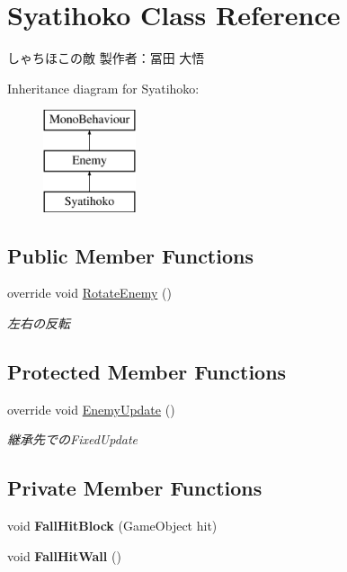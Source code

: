 \hypertarget{class_syatihoko}{}\section{Syatihoko Class Reference}
\label{class_syatihoko}


しゃちほこの敵 製作者：冨田 大悟  


Inheritance diagram for Syatihoko\+:\begin{figure}[H]
\begin{center}
\leavevmode
\includegraphics[height=3.000000cm]{class_syatihoko}
\end{center}
\end{figure}
\subsection*{Public Member Functions}
\begin{DoxyCompactItemize}
\item 
override void \hyperlink{class_syatihoko_ab4c8b474dcba39edb7ed80e5149ee39c}{Rotate\+Enemy} ()
\begin{DoxyCompactList}\small\item\em 左右の反転 \end{DoxyCompactList}\end{DoxyCompactItemize}
\subsection*{Protected Member Functions}
\begin{DoxyCompactItemize}
\item 
override void \hyperlink{class_syatihoko_a921cf2c05d610f19214fb476c9ff8a6c}{Enemy\+Update} ()
\begin{DoxyCompactList}\small\item\em 継承先での\+Fixed\+Update \end{DoxyCompactList}\end{DoxyCompactItemize}
\subsection*{Private Member Functions}
\begin{DoxyCompactItemize}
\item 
\mbox{\label{class_syatihoko_af87101bc4c2c7443de73e7227c5c562f}} 
void {\bfseries Fall\+Hit\+Block} (Game\+Object hit)
\item 
\mbox{\label{class_syatihoko_a14314a977cd8a008b8a3b84a68ce3994}} 
void {\bfseries Fall\+Hit\+Wall} ()
\end{DoxyCompactItemize}

